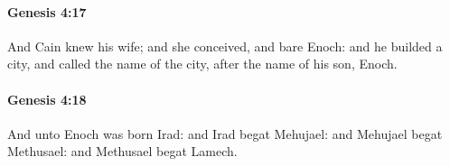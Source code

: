 		\paragraph{Genesis 4:17} %
			\label{GENESIS-4-17}

			And Cain knew his wife; and she conceived, and bare Enoch: and he builded a city, and called the name of the city, after the name of his son, Enoch.


		\paragraph{Genesis 4:18} %
			\label{GENESIS-4-18}

			And unto Enoch was born Irad: and Irad begat Mehujael: and Mehujael begat Methusael: and Methusael begat Lamech.


